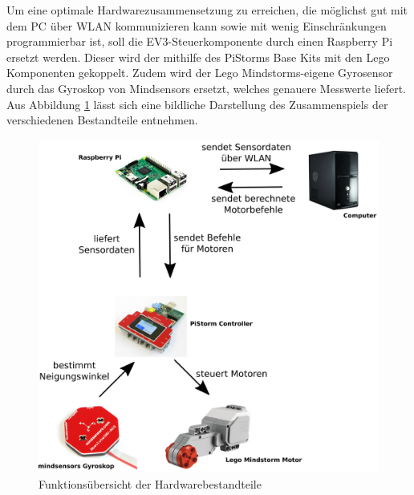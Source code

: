 \documentclass[german,11pt,a4paper]{netforms}
\begin{document}
Um eine optimale Hardwarezusammensetzung zu erreichen, die möglichst gut mit dem PC über WLAN kommunizieren kann sowie mit wenig Einschränkungen programmierbar ist, soll die EV3-Steuerkomponente durch einen Raspberry Pi ersetzt werden. Dieser wird der mithilfe des PiStorms Base Kits mit den Lego Komponenten gekoppelt. Zudem wird der Lego Mindstorms-eigene Gyrosensor durch das Gyroskop von Mindsensors ersetzt, welches genauere Messwerte liefert. \\

Aus Abbildung \ref{fig:hardware} lässt sich eine bildliche Darstellung des Zusammenspiels der verschiedenen Bestandteile entnehmen. 

\begin{figure}
\centering
\includegraphics[scale=1.5]{images/Inkscape.png}
\caption{Funktionsübersicht der Hardwarebestandteile}\label{fig:hardware}
\end{figure}
\end{document}
